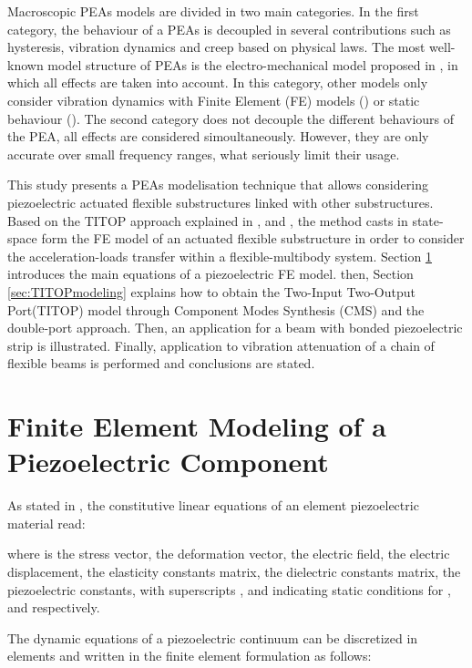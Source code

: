 \documentclass{ifacconf}
\begin{document}
Macroscopic PEAs models  are divided in two main categories. In the first category, the behaviour of a PEAs is decoupled in several contributions such as hysteresis, vibration dynamics and creep based on physical laws. The most well-known model structure of PEAs is the electro-mechanical model proposed in \cite{Goldfarb1997_PEA}, in which all effects are taken into account. In this category, other models only consider vibration dynamics with Finite Element (FE) models (\cite{Piefort2000_PEA}) or static behaviour (\cite{Smits1991_PEA}). The second category does not decouple the different behaviours of the PEA, all effects are considered simoultaneously. However, they are only accurate over small frequency ranges, what seriously limit their usage.

This study presents a PEAs modelisation technique that allows considering piezoelectric actuated flexible substructures linked with other substructures. Based on the TITOP approach explained in \cite{Perez2015_LM}, \cite{Alazard2015_LM} and \cite{Perez_IFAtheory2015}, the method casts in state-space form the FE model of an actuated flexible substructure in order to consider the acceleration-loads transfer within a flexible-multibody system. Section \ref{sec:finite element} introduces the main equations of a piezoelectric FE model. then, Section \ref{sec:TITOPmodeling} explains how to obtain the Two-Input Two-Output Port(TITOP) model through Component Modes Synthesis (CMS) and the double-port approach. Then, an application for a beam with bonded piezoelectric strip is illustrated. Finally, application to vibration attenuation of a chain of flexible beams is performed and conclusions are stated. 


\section{Finite Element Modeling of a Piezoelectric Component}
\label{sec:finite element}

As stated in \cite{Ansi1988_PEA}, the constitutive linear equations of an element piezoelectric material read:

 

 

where  is the stress vector,  the deformation vector, the electric field,  the electric displacement,  the elasticity constants matrix,  the dielectric constants matrix,  the piezoelectric constants, with superscripts ,  and  indicating static conditions for ,  and  respectively.

The dynamic equations of a piezoelectric continuum can be discretized in elements and written in the finite element formulation as follows:
\end{document}
